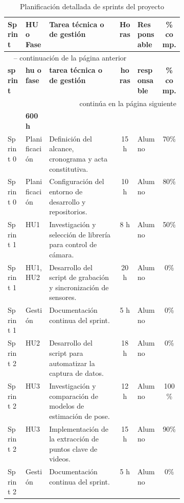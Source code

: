 \documentclass[
11pt, %
]{charter}
\begin{document}
\begin{longtable}{|l|l|p{0.4\linewidth}|c|l|c|}

\caption{Planificación detallada de sprints del proyecto}
\label{tab:sprints} \\

\hline
\rowcolor[HTML]{C0C0C0}
\textbf{Sprint} & \textbf{HU o Fase} & \textbf{Tarea técnica o de gestión} & \textbf{Horas} & \textbf{Responsable} & \textbf{\% comp.} \\
\hline
\endfirsthead

\multicolumn{6}{l}{\tablename\ \thetable{} -- continuación de la página anterior} \\
\hline
\rowcolor[HTML]{C0C0C0}
\textbf{sprint} & \textbf{hu o fase} & \textbf{tarea técnica o de gestión} & \textbf{horas} & \textbf{responsable} & \textbf{\% comp.} \\
\hline
\endhead

\hline
\multicolumn{6}{r}{{continúa en la página siguiente}} \\
\endfoot

\hline
\multicolumn{3}{|r|}{\textbf{total de horas estimadas}} & \textbf{600 h} & & \\
\hline
\endlastfoot


Sprint 0 & Planificación & Definición del alcance, cronograma y acta constitutiva. & 15 h & Alumno & 70\% \\
Sprint 0 & Planificación & Configuración del entorno de desarrollo y repositorios. & 10 h & Alumno & 80\% \\ \hline

Sprint 1 & HU1 & Investigación y selección de librería para control de cámara. & 8 h & Alumno & 50\% \\
Sprint 1 & HU1, HU2 & Desarrollo del script de grabación y sincronización de sensores. & 20 h & Alumno & 0\% \\
Sprint 1 & Gestión & Documentación continua del sprint. & 5 h & Alumno & 0\% \\ \hline

Sprint 2 & HU2 & Desarrollo del script para automatizar la captura de datos. & 18 h & Alumno & 0\% \\
Sprint 2 & HU3 & Investigación y comparación de modelos de estimación de pose. & 12 h & Alumno & 100\% \\
Sprint 2 & HU3 & Implementación de la extracción de puntos clave de videos. & 15 h & Alumno & 90\% \\
Sprint 2 & Gestión & Documentación continua del sprint. & 5 h & Alumno & 0\% \\ \hline


\end{longtable}
\end{document}
